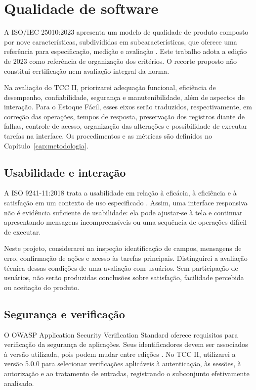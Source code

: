 \section{Qualidade de software}
\label{sec:qualidade}

A ISO/IEC 25010:2023 apresenta um modelo de qualidade de produto composto por nove características, subdivididas em subcaracterísticas, que oferece uma referência para especificação, medição e avaliação \cite{ISO25010_2023}. Este trabalho adota a edição de 2023 como referência de organização dos critérios. O recorte proposto não constitui certificação nem avaliação integral da norma.

Na avaliação do TCC II, priorizarei adequação funcional, eficiência de desempenho, confiabilidade, segurança e manutenibilidade, além de aspectos de interação. Para o Estoque Fácil, esses eixos serão traduzidos, respectivamente, em correção das operações, tempos de resposta, preservação dos registros diante de falhas, controle de acesso, organização das alterações e possibilidade de executar tarefas na interface. Os procedimentos e as métricas são definidos no Capítulo~\ref{cap:metodologia}.

\subsection{Usabilidade e interação}

A ISO 9241-11:2018 trata a usabilidade em relação à eficácia, à eficiência e à satisfação em um contexto de uso especificado \cite{ISO9241_11}. Assim, uma interface responsiva não é evidência suficiente de usabilidade: ela pode ajustar-se à tela e continuar apresentando mensagens incompreensíveis ou uma sequência de operações difícil de executar.

Neste projeto, considerarei na inspeção identificação de campos, mensagens de erro, confirmação de ações e acesso às tarefas principais. Distinguirei a avaliação técnica dessas condições de uma avaliação com usuários. Sem participação de usuários, não serão produzidas conclusões sobre satisfação, facilidade percebida ou aceitação do produto.

\subsection{Segurança e verificação}

O OWASP Application Security Verification Standard oferece requisitos para verificação da segurança de aplicações. Seus identificadores devem ser associados à versão utilizada, pois podem mudar entre edições \cite{OWASPASVS2025}. No TCC II, utilizarei a versão 5.0.0 para selecionar verificações aplicáveis à autenticação, às sessões, à autorização e ao tratamento de entradas, registrando o subconjunto efetivamente analisado.

